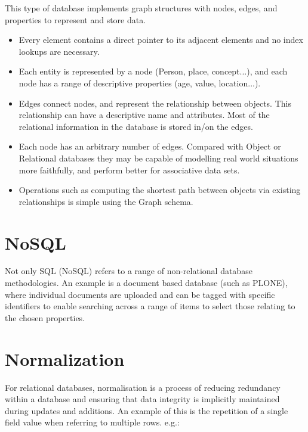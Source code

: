 \documentclass[12pt]{report}
\begin{document}
This type of database implements graph structures with nodes, edges, and properties to represent and store data.

\begin{itemize}
	\item Every element contains a direct pointer to its adjacent elements and no index lookups are necessary. 
	
	\item Each entity is represented by a node (Person, place, concept...), and each node has a range of descriptive properties (age, value, location...).
	
	\item Edges connect nodes, and represent the relationship between objects. This relationship can have a descriptive name and attributes. Most of the relational information in the database is stored in/on the edges.
	
	\item Each node has an arbitrary number of edges. Compared with Object or Relational databases they may be capable of modelling real world situations more faithfully, and perform better for associative data sets.
	
	\item Operations such as computing the shortest path between objects via existing relationships is simple using the Graph schema.
\end{itemize}

\section*{NoSQL}

Not only SQL (NoSQL) refers to a range of non-relational database methodologies. An example is a document based database (such as PLONE), where individual documents are uploaded and can be tagged with specific identifiers to enable searching across a range of items to select those relating to the chosen properties.

\section*{Normalization}
For relational databases, normalisation is a process of reducing redundancy within a database and ensuring that data integrity is implicitly maintained during updates and additions. An example of this is the repetition of a single field value when referring to multiple rows. e.g.:
\vspace*{1\baselineskip}
\end{document}
